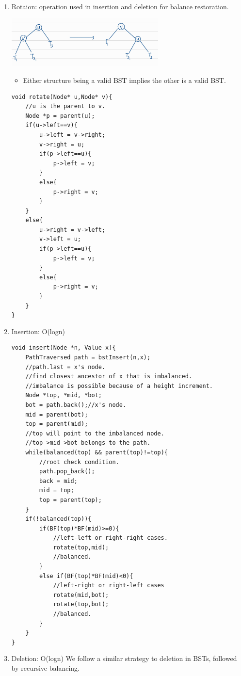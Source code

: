 \documentclass{report}
\begin{document}
\begin{itemize}
\begin{enumerate}
\item Rotaion: operation used in insertion and deletion for balance restoration.
\begin{center}
\includegraphics[width=8cm]{rsrc/AVL-rotation.jpg}
\end{center}
\begin{itemize}
\item Either structure being a valid BST implies the other is a valid BST.
\end{itemize}
\begin{lstlisting}
void rotate(Node* u,Node* v){
    //u is the parent to v.
    Node *p = parent(u);
    if(u->left==v){
        u->left = v->right;
        v->right = u;
        if(p->left==u){
            p->left = v;
        }
        else{
            p->right = v;
        }
    }
    else{
        u->right = v->left;
        v->left = u;
        if(p->left==u){
            p->left = v;
        }
        else{
            p->right = v;
        }
    }
}
\end{lstlisting}
\item Insertion: O(logn)
\begin{lstlisting}
void insert(Node *n, Value x){
    PathTraversed path = bstInsert(n,x);
    //path.last = x's node.
    //find closest ancestor of x that is imbalanced.
    //imbalance is possible because of a height increment.
    Node *top, *mid, *bot;
    bot = path.back();//x's node.
    mid = parent(bot);
    top = parent(mid);
    //top will point to the imbalanced node.
    //top->mid->bot belongs to the path.
    while(balanced(top) && parent(top)!=top){
        //root check condition.
        path.pop_back();
        back = mid;    
        mid = top;
        top = parent(top);
    }
    if(!balanced(top)){
        if(BF(top)*BF(mid)>=0){
            //left-left or right-right cases.
            rotate(top,mid);
            //balanced.
        }
        else if(BF(top)*BF(mid)<0){
            //left-right or right-left cases
            rotate(mid,bot);
            rotate(top,bot);
            //balanced.
        }
    }
}
\end{lstlisting}
\item Deletion: O(logn) We follow a similar strategy to deletion in BSTs, followed by recursive balancing.

\end{enumerate}
\end{itemize}
\end{document}
